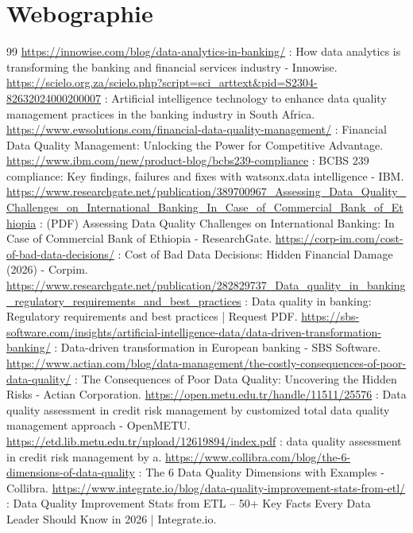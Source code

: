 \section*{Webographie}
\begin{thebibliography}{99}
     \url{https://innowise.com/blog/data-analytics-in-banking/} : How data analytics is transforming the banking and financial services industry - Innowise.
     \url{https://scielo.org.za/scielo.php?script=sci_arttext&pid=S2304-82632024000200007} : Artificial intelligence technology to enhance data quality management practices in the banking industry in South Africa.
     \url{https://www.ewsolutions.com/financial-data-quality-management/} : Financial Data Quality Management: Unlocking the Power for Competitive Advantage.
     \url{https://www.ibm.com/new/product-blog/bcbs239-compliance} : BCBS 239 compliance: Key findings, failures and fixes with watsonx.data intelligence - IBM.
     \url{https://www.researchgate.net/publication/389700967_Assessing_Data_Quality_Challenges_on_International_Banking_In_Case_of_Commercial_Bank_of_Ethiopia} : (PDF) Assessing Data Quality Challenges on International Banking: In Case of Commercial Bank of Ethiopia - ResearchGate.
     \url{https://corp-im.com/cost-of-bad-data-decisions/} : Cost of Bad Data Decisions: Hidden Financial Damage (2026) - Corpim.
     \url{https://www.researchgate.net/publication/282829737_Data_quality_in_banking_regulatory_requirements_and_best_practices} : Data quality in banking: Regulatory requirements and best practices | Request PDF.
     \url{https://sbs-software.com/insights/artificial-intelligence-data/data-driven-transformation-banking/} : Data-driven transformation in European banking - SBS Software.
     \url{https://www.actian.com/blog/data-management/the-costly-consequences-of-poor-data-quality/} : The Consequences of Poor Data Quality: Uncovering the Hidden Risks - Actian Corporation.
     \url{https://open.metu.edu.tr/handle/11511/25576} : Data quality assessment in credit risk management by customized total data quality management approach - OpenMETU.
     \url{https://etd.lib.metu.edu.tr/upload/12619894/index.pdf} : data quality assessment in credit risk management by a.
     \url{https://www.collibra.com/blog/the-6-dimensions-of-data-quality} : The 6 Data Quality Dimensions with Examples - Collibra.
     \url{https://www.integrate.io/blog/data-quality-improvement-stats-from-etl/} : Data Quality Improvement Stats from ETL – 50+ Key Facts Every Data Leader Should Know in 2026 | Integrate.io.

\end{thebibliography}
